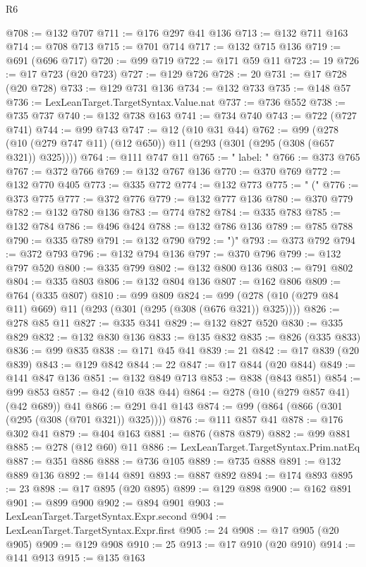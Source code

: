 \begin{lexlean}{R6}
\begin{coremodule}
{{{{{{{{{{{{{{{{{{{{{{{{{{{{{{{{{{{{{{{{{{{{{{{{{{@708 := @132 @707
@711 := @176 @297 @41 @136
@713 := @132 @711 @163
@714 := @708 @713
@715 := @701 @714
@717 := @132 @715 @136
@719 := @691 (@696 @717)
@720 := @99 @719
@722 := @171 @59 @11
@723 := 19
@726 := @17 @723 (@20 @723)
@727 := @129 @726
@728 := 20
@731 := @17 @728 (@20 @728)
@733 := @129 @731 @136
@734 := @132 @733
@735 := @148 @57
@736 := LexLeanTarget.TargetSyntax.Value.nat
@737 := @736 @552
@738 := @735 @737
@740 := @132 @738 @163
@741 := @734 @740
@743 := @722 (@727 @741)
@744 := @99 @743
@747 := @12 (@10 @31 @44)
@762 := @99 (@278 (@10 (@279 @747 @11) (@12 @650)) @11 (@293 (@301 (@295 (@308 (@657 @321)) @325))))
@764 := @111 @747 @11
@765 := "  label: "
@766 := @373 @765
@767 := @372 @766
@769 := @132 @767 @136
@770 := @370 @769
@772 := @132 @770 @405
@773 := @335 @772
@774 := @132 @773
@775 := " ("
@776 := @373 @775
@777 := @372 @776
@779 := @132 @777 @136
@780 := @370 @779
@782 := @132 @780 @136
@783 := @774 @782
@784 := @335 @783
@785 := @132 @784
@786 := @496 @424
@788 := @132 @786 @136
@789 := @785 @788
@790 := @335 @789
@791 := @132 @790
@792 := ")"
@793 := @373 @792
@794 := @372 @793
@796 := @132 @794 @136
@797 := @370 @796
@799 := @132 @797 @520
@800 := @335 @799
@802 := @132 @800 @136
@803 := @791 @802
@804 := @335 @803
@806 := @132 @804 @136
@807 := @162 @806
@809 := @764 (@335 @807)
@810 := @99 @809
@824 := @99 (@278 (@10 (@279 @84 @11) @669) @11 (@293 (@301 (@295 (@308 (@676 @321)) @325))))
@826 := @278 @85 @11
@827 := @335 @341
@829 := @132 @827 @520
@830 := @335 @829
@832 := @132 @830 @136
@833 := @135 @832
@835 := @826 (@335 @833)
@836 := @99 @835
@838 := @171 @45 @41
@839 := 21
@842 := @17 @839 (@20 @839)
@843 := @129 @842
@844 := 22
@847 := @17 @844 (@20 @844)
@849 := @141 @847 @136
@851 := @132 @849 @713
@853 := @838 (@843 @851)
@854 := @99 @853
@857 := @42 (@10 @38 @44)
@864 := @278 (@10 (@279 @857 @41) (@42 @689)) @41
@866 := @291 @41 @143
@874 := @99 (@864 (@866 (@301 (@295 (@308 (@701 @321)) @325))))
@876 := @111 @857 @41
@878 := @176 @302 @41
@879 := @404 @163
@881 := @876 (@878 @879)
@882 := @99 @881
@885 := @278 (@12 @60) @11
@886 := LexLeanTarget.TargetSyntax.Prim.natEq
@887 := @351 @886
@888 := @736 @105
@889 := @735 @888
@891 := @132 @889 @136
@892 := @144 @891
@893 := @887 @892
@894 := @174 @893
@895 := 23
@898 := @17 @895 (@20 @895)
@899 := @129 @898
@900 := @162 @891
@901 := @899 @900
@902 := @894 @901
@903 := LexLeanTarget.TargetSyntax.Expr.second
@904 := LexLeanTarget.TargetSyntax.Expr.first
@905 := 24
@908 := @17 @905 (@20 @905)
@909 := @129 @908
@910 := 25
@913 := @17 @910 (@20 @910)
@914 := @141 @913
@915 := @135 @163
}}}}}}}}}}}}}}}}}}}}}}}}}}}}}}}}}}}}}}}}}}}}}}}}}}
\end{coremodule}
\end{lexlean}
